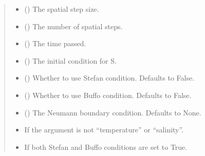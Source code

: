 \documentclass[a4paper,11pt,english,openany]{sphinxmanual}
\begin{document}
\begin{fulllineitems}
\begin{quote}
\begin{description}
\begin{itemize}
\item {} 
\sphinxAtStartPar
{} () \textendash{} The spatial step size.

\item {} 
\sphinxAtStartPar
{} () \textendash{} The number of spatial steps.

\item {} 
\sphinxAtStartPar
{} () \textendash{} The time passed.

\item {} 
\sphinxAtStartPar
{} () \textendash{} The initial condition for S.

\item {} 
\sphinxAtStartPar
{} (\sphinxstyleliteralemphasis{\sphinxupquote{, }}) \textendash{} Whether to use Stefan condition. Defaults to False.

\item {} 
\sphinxAtStartPar
{} (\sphinxstyleliteralemphasis{\sphinxupquote{, }}) \textendash{} Whether to use Buffo condition. Defaults to False.

\item {} 
\sphinxAtStartPar
{} (\sphinxstyleliteralemphasis{\sphinxupquote{, }}) \textendash{} The Neumann boundary condition. Defaults to None.

\end{itemize}

\begin{itemize}
\item {} 
\sphinxAtStartPar
{} \textendash{} If the argument is not “temperature” or “salinity”.

\item {} 
\sphinxAtStartPar
{} \textendash{} If both Stefan and Buffo conditions are set to True.


\end{itemize}
\end{description}
\end{quote}
\end{fulllineitems}
\end{document}
